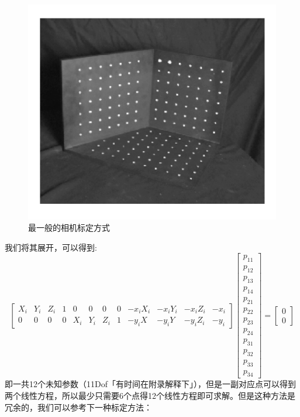 \documentclass[12pt]{article}
\begin{document}
\begin{figure}[ht]
    \centering
    \includegraphics[scale=0.5]{./img/xjbd1.png}
    \caption{最一般的相机标定方式}
    \label{fig:xjbd1}
\end{figure}

我们将其展开，可以得到:
\begin{equation}
    \nonumber
    \left[\begin{array}{cccccccccccc}
        X_{i} & Y_{i} & Z_{i} & 1 & 0 & 0 & 0 & 0 & -x_{i} X_{i} & -x_{i} Y_{i} & -x_{i} Z_{i} & -x_{i} \\
        0 & 0 & 0 & 0 & X_{i} & Y_{i} & Z_{i} & 1 & -y_{i} X & -y_{i} Y & -y_{i} Z_{i} & -y_{i}
        \end{array}\right]\left[\begin{array}{c}
        p_{11} \\
        p_{12} \\
        p_{13} \\
        p_{14} \\
        p_{21} \\
        p_{22} \\
        p_{23} \\
        p_{24} \\
        p_{31} \\
        p_{32} \\
        p_{33} \\
        p_{34}
        \end{array}\right]=\left[\begin{array}{l}
        0 \\
        0
        \end{array}\right]
\end{equation}
即一共12个未知参数（11Dof「有时间在附录解释下」），但是一副对应点可以得到两个线性方程，所以最少只需要6个点得12个线性方程即可求解。但是这种方法是冗余的，我们可以参考下一种标定方法：
\end{document}
